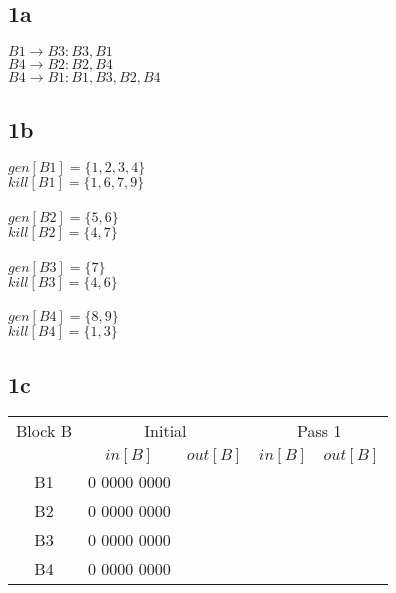 \documentclass[10pt,a4paper]{article}
\author{Lucas Swartsenburg\\6174388}
\begin{document}
\subsection*{1a}
$B1 \rightarrow B3:{B3,B1}$ \\
$B4 \rightarrow B2:{B2,B4}$ \\
$B4 \rightarrow B1:{B1,B3,B2,B4}$

\subsection*{1b}
$gen[B1]= \{1,2,3,4\} $\\
$kill[B1]= \{1,6,7,9\} $\\
\\
$gen[B2]= \{5,6\} $\\
$kill[B2]= \{4,7\} $\\
\\
$gen[B3]= \{7\} $\\
$kill[B3]= \{4,6\} $\\
\\
$gen[B4]= \{8,9\} $\\
$kill[B4]= \{1,3\} $\\

\subsection*{1c}
\begin{tabular}{|c|c|c|c|c|}
\hline Block B & \multicolumn{2}{|c|}{Initial}  & \multicolumn{2}{|c|}{Pass 1} \\  \cline{2-5}
			& $in[B]$ 		& $out[B]$ 	& $in[B]$ 	& $out[B]$ \\ 
\hline 	B1 	& 0 0000 0000 	&  			&  &  \\ 
		B2 	& 0 0000 0000 	&  &  &  \\ 
		B3 	& 0 0000 0000 	&  &  &  \\ 
		B4 	& 0 0000 0000 	&  &  &  \\ 
\hline 
\end{tabular} 
\end{document}
